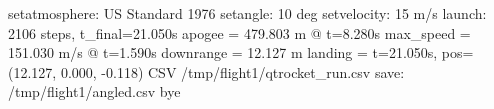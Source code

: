 \begin{console}
\ok setatmosphere: US Standard 1976
\ok setangle: 10 deg
\ok setvelocity: 15 m/s
\ok launch: 2106 steps, t_final=21.050s
  apogee    = 479.803 m @ t=8.280s
  max_speed = 151.030 m/s @ t=1.590s
  downrange = 12.127 m
  landing   = t=21.050s, pos=(12.127, 0.000, -0.118)
CSV /tmp/flight1/qtrocket_run.csv
\ok save: /tmp/flight1/angled.csv
\ok bye
\end{console}
